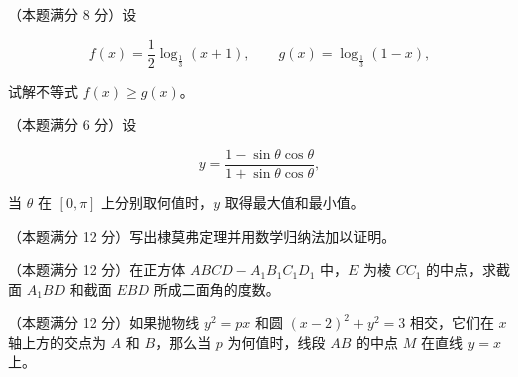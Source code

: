 \begin{question}
（本题满分 8 分）设

\nopagebreak[4]
\[
f(x)=\frac12\log_{\frac13}(x+1),\qquad
g(x)=\log_{\frac13}(1-x),
\]

试解不等式 $f(x)\ge g(x)$。

\end{question}
\begin{question}
（本题满分 6 分）设

\nopagebreak[4]
\[
y=\frac{1-\sin\theta\cos\theta}
{1+\sin\theta\cos\theta},
\]

当 $\theta$ 在 $[0,\pi]$ 上分别取何值时，$y$ 取得最大值和最小值。

\end{question}
\begin{question}
（本题满分 12 分）写出棣莫弗定理并用数学归纳法加以证明。

\Needspace{0.4\textheight}
\end{question}
\begin{question}
（本题满分 12 分）在正方体
$ABCD-A_1B_1C_1D_1$ 中，$E$ 为棱 $CC_1$ 的中点，求截面 $A_1BD$ 和截面 $EBD$ 所成二面角的度数。
\nopagebreak[4]
\begin{center}\end{center}
\nopagebreak[4]
\Needspace{0.4\textheight}
\end{question}
\begin{question}
（本题满分 12 分）如果抛物线 $y^2=px$ 和圆 $(x-2)^2+y^2=3$ 相交，它们在 $x$ 轴上方的交点为 $A$ 和 $B$，那么当 $p$ 为何值时，线段 $AB$ 的中点 $M$ 在直线 $y=x$ 上。
\nopagebreak[4]
\begin{center}\end{center}
\nopagebreak[4]

\end{question}